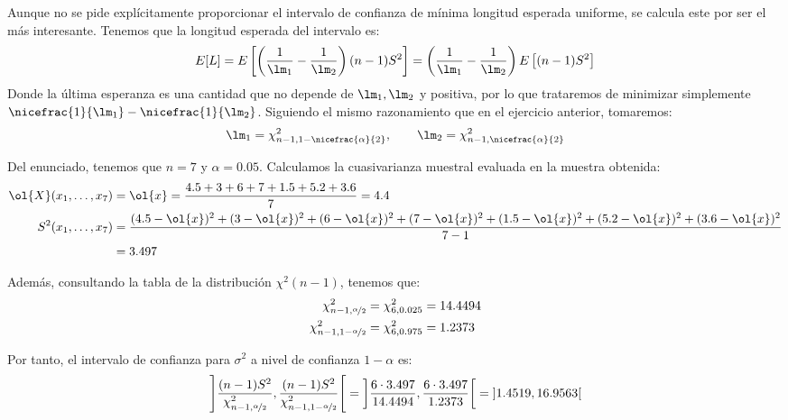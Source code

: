 \begin{ejercicio}
    Aunque no se pide explícitamente proporcionar el intervalo de confianza de mínima longitud esperada uniforme, se calcula este por ser el más interesante.
    Tenemos que la longitud esperada del intervalo es:
    \begin{equation*}
        E[L] = E\left[\left(\frac{1}{\lm_1}-\frac{1}{\lm_2}\right)(n-1)S^2\right] = \left(\frac{1}{\lm_1}-\frac{1}{\lm_2}\right)E\left[(n-1)S^2\right]
    \end{equation*}
    Donde la última esperanza es una cantidad que no depende de $\lm_1,\lm_2$ y positiva, por lo que trataremos de minimizar simplemente $\nicefrac{1}{\lm_1}-\nicefrac{1}{\lm_2}$. Siguiendo el mismo razonamiento que en el ejercicio anterior, tomaremos:
    \begin{equation*}
        \lm_1 = \chi^2_{n-1,1-\nicefrac{\alpha}{2}}, \qquad \lm_2 = \chi^2_{n-1,\nicefrac{\alpha}{2}}
    \end{equation*}

    Del enunciado, tenemos que $n=7$ y $\alpha = 0.05$. Calculamos la cuasivarianza muestral evaluada en la muestra obtenida:
    \begin{align*}
        \ol{X}(x_1, \ldots, x_7) &= \ol{x} = \frac{4.5+3+6+7+1.5+5.2+3.6}{7} = 4.4 \\
        S^2(x_1, \ldots, x_7) &= \frac{(4.5-\ol{x})^2 + (3-\ol{x})^2 + (6-\ol{x})^2 + (7-\ol{x})^2 + (1.5-\ol{x})^2 + (5.2-\ol{x})^2 + (3.6-\ol{x})^2}{7-1} \\
        &= 3.497
    \end{align*}

    Además, consultando la tabla de la distribución $\chi^2(n-1)$, tenemos que:
    \begin{align*}
        \chi^2_{n-1,\nicefrac{\alpha}{2}} &= \chi^2_{6,0.025} = 14.4494 \\
        \chi^2_{n-1,1-\nicefrac{\alpha}{2}} &= \chi^2_{6,0.975} = 1.2373
    \end{align*}

    Por tanto, el intervalo de confianza para $\sigma^2$ a nivel de confianza $1-\alpha$ es:
    \begin{equation*}
        \left]\frac{(n-1)S^2}{\chi^2_{n-1,\nicefrac{\alpha}{2}}},\frac{(n-1)S^2}{\chi^2_{n-1,1-\nicefrac{\alpha}{2}}}\right[ = \left]\frac{6\cdot 3.497}{14.4494},\frac{6\cdot 3.497}{1.2373}\right[ = \left]1.4519, 16.9563\right[
    \end{equation*}
\end{ejercicio}

